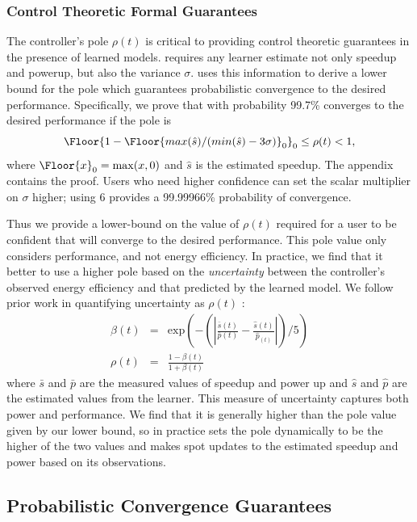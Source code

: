 \subsubsection{Control Theoretic Formal Guarantees}
\label{sec:guarantees}
The controller's pole $\rho(t)$ is critical to providing control
theoretic guarantees in the presence of learned models.  \SYSTEM{}
requires any learner estimate not only speedup and powerup, but also
the variance $\sigma$.  \SYSTEM{} uses this information to derive a
lower bound for the pole which guarantees probabilistic convergence to
the desired performance. Specifically, we prove that with probability
99.7\% \SYSTEM{} converges to the desired performance if the pole is
$$\Floor{1- \Floor{max(\hat{s})/(min(\hat{s}) - 3\sigma)}_0}_0 \leq \rho(t)
< 1,$$ where $\Floor{x}_0 = \max(x,0)$ and $\hat{s}$ is the estimated
speedup. The appendix contains the proof. Users who need higher
confidence can set the scalar multiplier on $\sigma$ higher; \eg{}
using $6$ provides a 99.99966\% probability of convergence.

Thus we provide a lower-bound on the value of $\rho(t)$ required for a
user to be confident that \SYSTEM{} will converge to the desired
performance.  This pole value only considers performance, and not
energy efficiency.  In practice, we find that it better to use a
higher pole based on the \emph{uncertainty} between the controller's
observed energy efficiency and that predicted by the learned model.
We follow prior work in quantifying uncertainty as $\rho(t) $
\cite{Tokic2010}:
\begin{equation}
  \begin{array}{rcl}
    \beta(t) &=&  \text{exp}{\left(- \left( \left|   \frac{\bar{s}(t)}{\bar{p}(t)}  -\frac{ \hat{s}(t)}{\hat{p}_(t)} \right| \right) /5\right)} \\
    \rho(t) &=& \frac{1-\beta(t)}{1+\beta(t)}
  \end{array}
  \label{eqn:uncer}
\end{equation}
where $\bar{s}$ and $\bar{p}$ are the measured values of speedup and
power up and $\hat{s}$ and $\hat{p}$ are the estimated values from the
learner.  This measure of uncertainty captures both power and
performance.  We find that it is generally higher than the pole value
given by our lower bound, so in practice \SYSTEM{} sets the pole
dynamically to be the higher of the two values and \SYSTEM{} makes
spot updates to the estimated speedup and power based on its
observations.
\subsection*{Probabilistic Convergence Guarantees}


